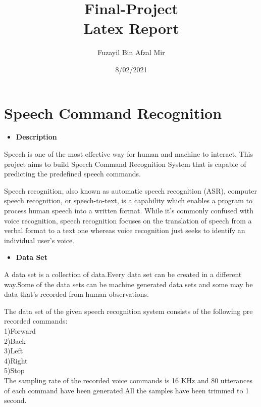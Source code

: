 \documentclass[a4paper,12pt]{article}
\title{Final-Project\\ Latex Report}
\author{Fuzayil Bin Afzal Mir}
\date{8/02/2021}
\begin{document}
	\maketitle
	
	
	\newpage

    \section{Speech Command Recognition}
	
	
	 \begin{itemize}
	    \item \Large\textbf{Description}
	    	\end{itemize}
	Speech is one of the most effective way for human and machine to interact. This project aims to build Speech Command Recognition System that is capable of predicting the predefined speech commands.


Speech recognition, also known as automatic speech recognition (ASR), computer speech recognition, or speech-to-text, is a capability which enables a program to process human speech into a written format. While it’s commonly confused with voice recognition, speech recognition focuses on the translation of speech from a verbal format to a text one whereas voice recognition just seeks to identify an individual user’s voice.
	
	
\begin{itemize}
	    \item \Large\textbf{Data Set}
	    	\end{itemize}	
	A data set is a collection of data.Every data set can be created in a different way.Some of the data sets can be machine generated data sets and some may be data that's recorded from human observations. 
	
	The data set of the given speech recognition system consists of the following pre recorded commands:\\
	
	
	1)Forward\\

	2)Back \\

	3)Left\\

	4)Right\\

	5)Stop\\
	
	The sampling rate of the recorded voice commands is 16 KHz and 80 utterances of each command have been generated.All the samples have been trimmed to 1 second.
	
\end{document}
